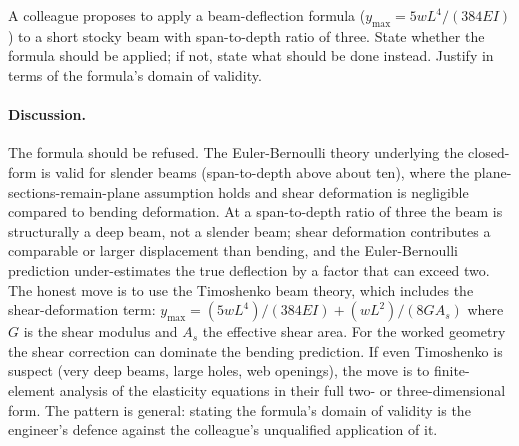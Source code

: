 \begin{exercise}
A colleague proposes to apply a beam-deflection formula
($y_{\max} = 5wL^{4}/(384 E I)$) to a short stocky beam with
span-to-depth ratio of three. State whether the formula
should be applied; if not, state what should be done instead.
Justify in terms of the formula's domain of validity.

\paragraph{Discussion.} The formula should be refused. The
Euler-Bernoulli theory underlying the closed-form is valid for
slender beams (span-to-depth above about ten), where the
plane-sections-remain-plane assumption holds and shear deformation
is negligible compared to bending deformation. At a span-to-depth
ratio of three the beam is structurally a deep beam, not a
slender beam; shear deformation contributes a comparable or larger
displacement than bending, and the Euler-Bernoulli prediction
under-estimates the true deflection by a factor that can exceed
two. The honest move is to use the Timoshenko beam theory, which
includes the shear-deformation term:
$y_{\max} = (5wL^{4})/(384 EI) + (wL^{2})/(8 G A_{s})$ where $G$
is the shear modulus and $A_{s}$ the effective shear area. For
the worked geometry the shear correction can dominate the bending
prediction. If even Timoshenko is suspect (very deep beams, large
holes, web openings), the move is to finite-element analysis of
the elasticity equations in their full two- or three-dimensional
form. The pattern is general: stating the formula's domain of
validity is the engineer's defence against the colleague's
unqualified application of it.
\end{exercise}

